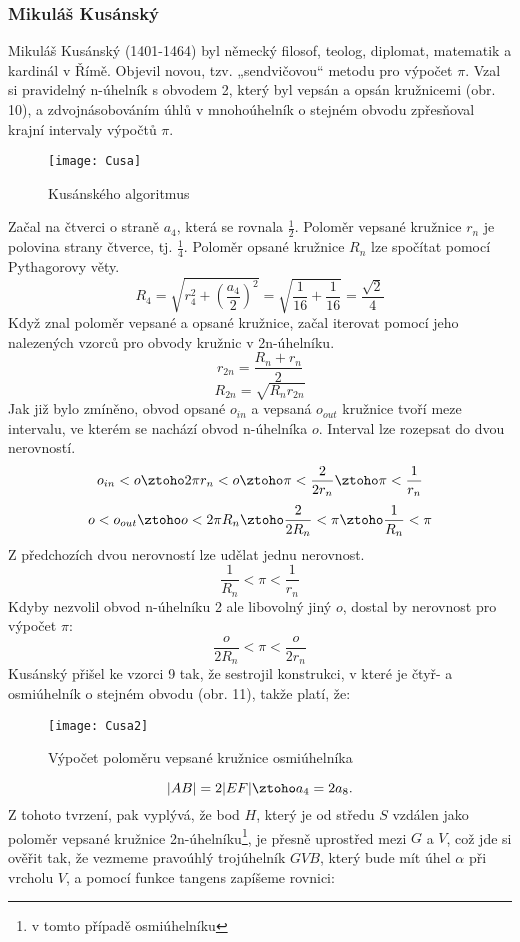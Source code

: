 \documentclass[soc]{gzwroc} %
\begin{document}
\subsubsection{Mikuláš Kusánský}
Mikuláš Kusánský (1401-1464) byl německý filosof, teolog, diplomat, matematik a kardinál v Římě. Objevil novou, tzv. „sendvičovou“ metodu pro výpočet $\pi$. Vzal si pravidelný n-úhelník s obvodem 2, který byl vepsán a opsán kružnicemi (obr. 10), a zdvojnásobováním úhlů v mnohoúhelník o stejném obvodu zpřesňoval krajní intervaly výpočtů $\pi$.

\begin{figure}[!ht]
\texttt{[image: Cusa]}
\caption{Kusánského algoritmus}
\label{fig:kruh}
\end{figure}
Začal na čtverci o straně $a_4$, která se rovnala $\frac{1}{2}$. Poloměr vepsané kružnice $r_n$ je polovina strany čtverce, tj. $\frac{1}{4}$. Poloměr opsané kružnice $R_n$ lze spočítat pomocí Pythagorovy věty.
$$
R_4=\sqrt{r_4^2+\left(\frac{a_4}{2}\right)^2}=\sqrt{\frac{1}{16}+\frac{1}{16}}=\frac{\sqrt{2}}{4}
$$
Když znal poloměr vepsané a opsané kružnice, začal iterovat pomocí jeho nalezených vzorců pro obvody kružnic v 2n-úhelníku.
\begin{equation}
r_{2n}=\frac{R_n+r_n}{2} 
\end{equation}
\begin{equation}
R_{2n}=\sqrt{R_nr_{2n}}
\end{equation} 
Jak již bylo zmíněno, obvod opsané $o_{in}$ a vepsaná $o_{out}$ kružnice tvoří meze intervalu, ve kterém se nachází obvod n-úhelníka $o$. Interval lze rozepsat do dvou nerovností.
$$
o_{in}<o \ztoho 2\pi r_n<o \ztoho \pi<\frac{2}{2r_n} \ztoho \pi<\frac{1}{r_n}
$$
$$
o<o_{out} \ztoho o<2\pi R_n \ztoho \frac{2}{2R_n}<\pi \ztoho \frac{1}{R_n}<\pi
$$
Z předchozích dvou nerovností lze udělat jednu nerovnost.
\begin{equation}
\frac{1}{R_n}<\pi<\frac{1}{r_n}
\end{equation}
Kdyby nezvolil obvod n-úhelníku 2 ale libovolný jiný $o$, dostal by nerovnost pro výpočet $\pi$:
$$
\frac{o}{2R_n}<\pi<\frac{o}{2r_n}
$$
Kusánský přišel ke vzorci 9 tak, že sestrojil konstrukci, v které je čtyř- a osmiúhelník o stejném obvodu (obr. 11), takže platí, že:
\begin{figure}[!ht]
\texttt{[image: Cusa2]}
\caption{Výpočet poloměru vepsané kružnice osmiúhelníka}
\label{fig:kruh}
\end{figure}
$$
|AB|=2|EF| \ztoho a_4=2a_8.
$$
Z tohoto tvrzení, pak vyplývá, že bod $H$, který je od středu $S$ vzdálen jako poloměr vepsané kružnice 2n-úhelníku\footnote[8]{v tomto případě osmiúhelníku}, je přesně uprostřed mezi $G$ a $V$, což jde si ověřit tak, že vezmeme pravoúhlý trojúhelník $GVB$, který bude mít úhel $\alpha$ při vrcholu $V$, a pomocí funkce tangens zapíšeme rovnici: %
\end{document}
